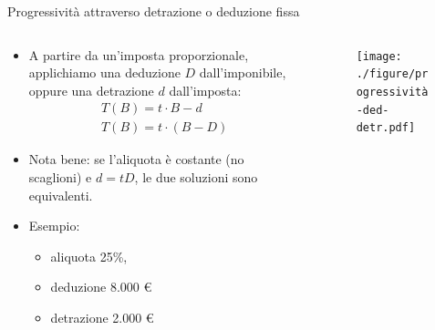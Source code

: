 \documentclass[aspectratio=64,11pt]{beamer}
\newcommand\€{\,\text{€}}
\begin{document}
\begin{frame}{Progressività attraverso detrazione o deduzione fissa}
\begin{columns}
\begin{column}{.4\columnwidth}
\small
\begin{itemize}
\item A partire da un'imposta proporzionale, applichiamo una deduzione $D$
  dall'imponibile, oppure una detrazione $d$ dall'imposta:
  \vspace{-3mm}
  \begin{gather*}
    T(B) = t\cdot B - d \\
    T(B)=t\cdot (B-D)
  \end{gather*}
\item Nota bene: se l'aliquota è costante (no scaglioni) e $d=tD$, le due
  soluzioni sono equivalenti.
\item Esempio:
\begin{itemize}
\item aliquota 25\%,
\item deduzione 8.000 €
\item detrazione 2.000 €
\end{itemize}
\end{itemize}
\end{column}

\begin{column}{.6\columnwidth}
\begin{figure}
\centering
\texttt{[image: ./figure/progressività-ded-detr.pdf]}
\end{figure}
\end{column}
\end{columns}
\end{frame}
\end{document}
